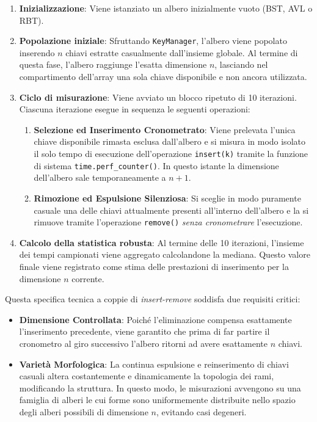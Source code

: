 \documentclass[10pt]{article}
\begin{document}
\begin{enumerate}
    \item \textbf{Inizializzazione}: Viene istanziato un albero inizialmente vuoto (BST, AVL o RBT).
    
    \item \textbf{Popolazione iniziale}: Sfruttando \texttt{KeyManager}, l'albero viene popolato inserendo $n$ chiavi estratte casualmente dall'insieme globale. Al termine di questa fase, l'albero raggiunge l'esatta dimensione $n$, lasciando nel compartimento dell'array una sola chiave disponibile e non ancora utilizzata.
    
    \item \textbf{Ciclo di misurazione}: Viene avviato un blocco ripetuto di 10 iterazioni. Ciascuna iterazione esegue in sequenza le seguenti operazioni:
    \begin{enumerate}
        \item \textbf{Selezione ed Inserimento Cronometrato}: Viene prelevata l'unica chiave disponibile rimasta esclusa dall'albero e si misura in modo isolato il solo tempo di esecuzione dell'operazione \texttt{insert(k)} tramite la funzione di sistema \texttt{time.perf\_counter()}. In questo istante la dimensione dell'albero sale temporaneamente a $n+1$.
        
        \item \textbf{Rimozione ed Espulsione Silenziosa}: Si sceglie in modo puramente casuale una delle chiavi attualmente presenti all'interno dell'albero e la si rimuove tramite l'operazione \texttt{remove()} \textit{senza cronometrare} l'esecuzione.
    \end{enumerate}

    \item \textbf{Calcolo della statistica robusta}: Al termine delle 10 iterazioni, l'insieme dei tempi campionati viene aggregato calcolandone la mediana. Questo valore finale viene registrato come stima delle prestazioni di inserimento per la dimensione $n$ corrente.
\end{enumerate}
Questa specifica tecnica a coppie di \textit{insert-remove} soddisfa due requisiti critici:
\begin{itemize}
    \item \textbf{Dimensione Controllata}: Poiché l'eliminazione compensa esattamente l'inserimento precedente, viene garantito che prima di far partire il cronometro al giro successivo l'albero ritorni ad avere esattamente $n$ chiavi.
    \item \textbf{Varietà Morfologica}: La continua espulsione e reinserimento di chiavi casuali altera costantemente e dinamicamente la topologia dei rami, modificando la struttura. In questo modo, le misurazioni avvengono su una famiglia di alberi le cui forme sono uniformemente distribuite nello spazio degli alberi possibili di dimensione $n$, evitando casi degeneri.
\end{itemize}
\clearpage
\end{document}
